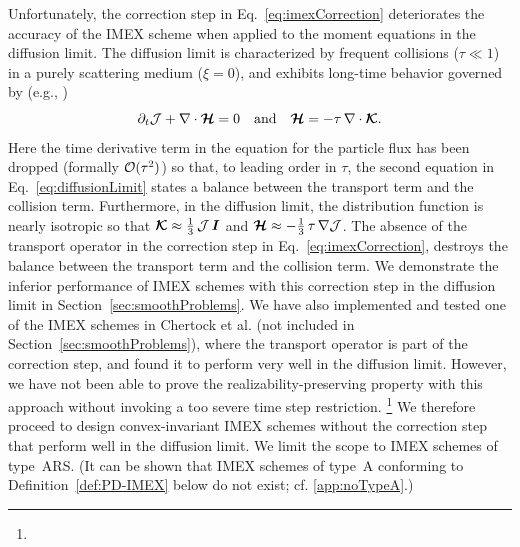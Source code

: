 Unfortunately, the correction step in Eq.~\eqref{eq:imexCorrection} deteriorates the accuracy of the IMEX scheme when applied to the moment equations in the diffusion limit.  
The diffusion limit is characterized by frequent collisions ($\tau\ll 1$) in a purely scattering medium ($\xi=0$), and exhibits long-time behavior governed by (e.g., \cite{jinLevermore_1996})
\begin{equation}
  \partial_{t}{\mathcal{J}} + \nabla\cdot\boldsymbol{\mathcal{H}} = 0
  \quad\text{and}\quad
  \boldsymbol{\mathcal{H}} = - \tau\,\nabla\cdot\boldsymbol{\mathcal{K}}.  
  \label{eq:diffusionLimit}
\end{equation}
Here the time derivative term in the equation for the particle flux has been dropped (formally $\mathcal{O}(\tau^{2})$) so that, to leading order in $\tau$, the second equation in Eq.~\eqref{eq:diffusionLimit} states a balance between the transport term and the collision term.  
Furthermore, in the diffusion limit, the distribution function is nearly isotropic so that $\boldsymbol{\mathcal{K}}\approx\frac{1}{3}\,\mathcal{J}\,\boldsymbol{I}$ and $\boldsymbol{\mathcal{H}}\approx-\frac{1}{3}\,\tau\,\nabla\mathcal{J}$.  
The absence of the transport operator in the correction step in Eq.~\eqref{eq:imexCorrection}, destroys the balance between the transport term and the collision term.  
We demonstrate the inferior performance of IMEX schemes with this correction step in the diffusion limit in Section~\ref{sec:smoothProblems}.  
We have also implemented and tested one of the IMEX schemes in Chertock et al. \cite{chertock_etal_2015} (not included in Section~\ref{sec:smoothProblems}), where the transport operator is part of the correction step, and found it to perform very well in the diffusion limit.  
However, we have not been able to prove the realizability-preserving property with this approach without invoking a too severe time step restriction.%
\footnote{}
We therefore proceed to design convex-invariant IMEX schemes without the correction step that perform well in the diffusion limit.  
We limit the scope to IMEX schemes of type~ARS.  
(It can be shown that IMEX schemes of type~A conforming to Definition~\ref{def:PD-IMEX} below do not exist; cf. \ref{app:noTypeA}.)

